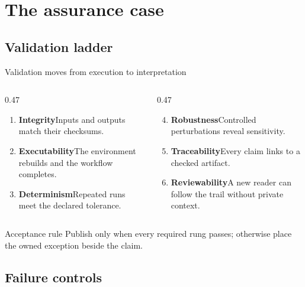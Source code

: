 \section{The assurance case}
\subsection{Validation ladder}

\begin{frame}{Validation moves from execution to interpretation}
  \begin{columns}[T,onlytextwidth]
    \begin{column}{0.47\textwidth}
      \begin{enumerate}
        \item \textbf{Integrity}\quad Inputs and outputs match their checksums.
        \item \textbf{Executability}\quad The environment rebuilds and the workflow completes.
        \item \textbf{Determinism}\quad Repeated runs meet the declared tolerance.
      \end{enumerate}
    \end{column}
    \begin{column}{0.47\textwidth}
      \begin{enumerate}
        \setcounter{enumi}{3}
        \item \textbf{Robustness}\quad Controlled perturbations reveal sensitivity.
        \item \textbf{Traceability}\quad Every claim links to a checked artifact.
        \item \textbf{Reviewability}\quad A new reader can follow the trail without private context.
      \end{enumerate}
    \end{column}
  \end{columns}

  \vfill
  \begin{exampleblock}{Acceptance rule}
    Publish only when every required rung passes; otherwise place the owned
    exception beside the claim.
  \end{exampleblock}
\end{frame}

\subsection{Failure controls}

